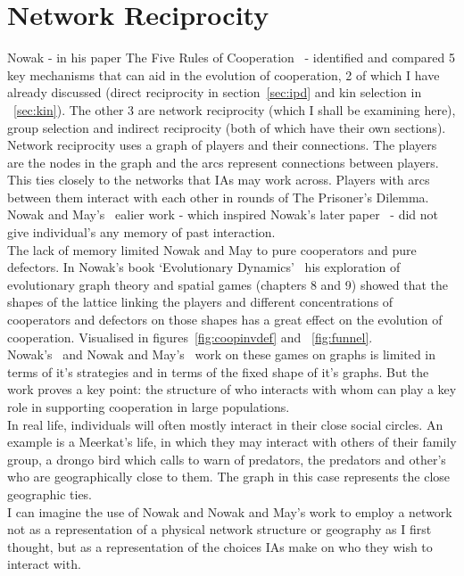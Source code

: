 \documentclass[]{final_report}
\begin{document}
\section{Network Reciprocity}
Nowak - in his paper The Five Rules of Cooperation~\cite{five_rules_coop} - identified and compared 5 key mechanisms that can aid in the evolution of cooperation, 2 of which I have already discussed (direct reciprocity in section~\ref{sec:ipd} and kin selection in ~\ref{sec:kin}). The other 3 are network reciprocity (which I shall be examining here), group selection and indirect reciprocity (both of which have their own sections).\\
Network reciprocity uses a graph of players and their connections. The players are the nodes in the graph and the arcs represent connections between players. This ties closely to the networks that IAs may work across. Players with arcs between them interact with each other in rounds of The Prisoner's Dilemma. Nowak and May's~\cite{spatial} ealier work - which inspired Nowak's later paper~\cite{five_rules_coop} - did not give individual's any memory of past interaction.\\
The lack of memory limited Nowak and May to pure cooperators and pure defectors. In Nowak's book `Evolutionary Dynamics'~\cite{nowak2006evolutionary} his exploration of evolutionary graph theory and spatial games (chapters 8 and 9) showed that the shapes of the lattice linking the players and different concentrations of cooperators and defectors on those shapes has a great effect on the evolution of cooperation. Visualised in figures~\ref{fig:coopinvdef} and ~\ref{fig:funnel}.\\
Nowak's~\cite{five_rules_coop, nowak2006evolutionary} and Nowak and May's~\cite{spatial} work on these games on graphs is limited in terms of it's strategies and in terms of the fixed shape of it's graphs. But the work proves a key point: the structure of who interacts with whom can play a key role in supporting cooperation in large populations.\\
In real life, individuals will often mostly interact in their close social circles. An example is a Meerkat's life, in which they may interact with others of their family group, a drongo bird which calls to warn of predators, the predators and other's who are geographically close to them. The graph in this case represents the close geographic ties.\\
I can imagine the use of Nowak and Nowak and May's work to employ a network not as a representation of a physical network structure or geography as I first thought, but as a representation of the choices IAs make on who they wish to interact with.\\
\end{document}
